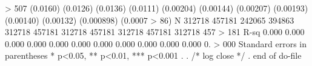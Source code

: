 > 507   
                 (0.0160)        (0.0126)        (0.0136)        (0.0111)       (0.00204)       (0.00144)       (0.00207)       (0.00193)       (0.00140)       (0.00132)      (0.000898)      (0.0007
> 86)   
N                  312718          457181          242065          394863          312718          457181          312718          457181          312718          457181          312718          457
> 181   
R-sq                0.000           0.000           0.000           0.000           0.000           0.000           0.000           0.000           0.000           0.000           0.000           0.
> 000   
Standard errors in parentheses
* p<0.05, ** p<0.01, *** p<0.001
{\smallskip}
. 
. /* log close */
. 
end of do-file
{\smallskip}

